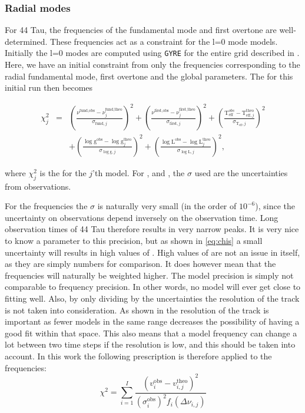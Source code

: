 \subsubsection{Radial modes}

For 44 Tau, the frequencies of the fundamental mode and first overtone are well-determined. These frequencies act as a constraint for the l=0 mode models. Initially the l=0 modes are computed using \texttt{GYRE} for the entire grid described in . Here, we have an initial constraint from only the frequencies corresponding to the radial fundamental mode, first overtone and the global parameters. The \chis for this initial run then becomes

\begin{align}
\chi^2_j & = & \left(\frac{\nu^{\text{fund,obs}}-\nu_j^{\text{fund,theo}}}{\sigma_{\text{fund},j}}\right)^2 
 + \left(\frac{\nu^{\text{first,obs}}-\nu_j^{\text{first,theo}}}{\sigma_{\text{first},j}}\right)^2 
 +
\left(\frac{\text{T}_\text{eff}^{obs}-\text{T}_{\text{eff},j}^{\text{theo}}}{\sigma_{\text{T}_\text{eff},j}}\right)^2 \nonumber \\
& & +
\left(\frac{\log \text{g}^\text{obs}-\log \text{g}^\text{theo}_j}{\sigma_{\log \text{g},j}}\right)^2 
 + \left(\frac{\log \text{L}^{\text{obs}}-\log \text{L}^\text{theo}_j}{\sigma_{\log \text{L},j}}\right)^2, 
 \label{eq:chis}
\end{align}

\noindent where $\chi^2_j$ is the \chis for the $j$'th model. For \teff, \logg and \lum, the $\sigma$ used are the uncertainties from observations. %

For the frequencies the $\sigma$ is naturally very small (in the order of $10^{-6}$), since the uncertainty on observations depend inversely on the observation time. Long observation times of 44 Tau therefore results in very narrow peaks. It is very nice to know a parameter to this precision, but as shown in \eqref{eq:chis} a small uncertainty will results in high values of \chis. High values of \chis are not an issue in itself, as they are simply numbers for comparison. It does however mean that the frequencies will naturally be weighted higher. The model precision is simply not comparable to frequency precision. In other words, no model will ever get close to fitting well. Also, by only dividing by the uncertainties the resolution of the track is not taken into consideration. As shown in  the resolution of the track is important as fewer models in the same range decreases the possibility of having a good fit within that space. This also means that a model frequency can change a lot between two time steps if the resolution is low, and this should be taken into account. In this work the following prescription is therefore applied to the frequencies: 
\begin{equation}
\label{sigma}
    \chi^2  = \sum^I_{i=1}\frac{\left(v^{\text{obs}}_{i}-v^{\text{theo}}_{i,j}\right)^2}{(\sigma^{\text{obs}}_i)^2 f_i(\Delta\nu_{i,j})}
\end{equation}

